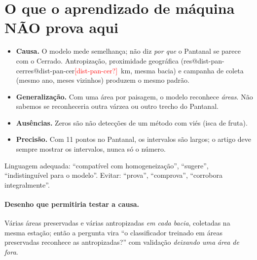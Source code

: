 \documentclass[11pt,a4paper]{article}
\makeatletter
\newcommand{\res}[1]{\ifcsname res@#1\endcsname\csname res@#1\endcsname\else\textcolor{red}{[#1?]}\fi}
\makeatother
\begin{document}
\section{O que o aprendizado de máquina NÃO prova aqui}
\begin{cuidado}
\begin{itemize}[leftmargin=1.2em]
\item \textbf{Causa.} O modelo mede semelhança; não diz \emph{por que} o Pantanal se parece com o
Cerrado. Antropização, proximidade geográfica (\res{dist-pan-cer}~km, mesma bacia) e campanha de
coleta (mesmo ano, meses vizinhos) produzem o mesmo padrão.
\item \textbf{Generalização.} Com uma área por paisagem, o modelo reconhece \emph{áreas}. Não
sabemos se reconheceria outra várzea ou outro trecho do Pantanal.
\item \textbf{Ausências.} Zeros são não detecções de um método com viés (isca de fruta).
\item \textbf{Precisão.} Com 11 pontos no Pantanal, os intervalos são largos; o artigo deve sempre
mostrar os intervalos, nunca só o número.
\end{itemize}
Linguagem adequada: ``compatível com homogeneização'', ``sugere'', ``indistinguível para o
modelo''. Evitar: ``prova'', ``comprova'', ``corrobora integralmente''.
\end{cuidado}

\paragraph{Desenho que permitiria testar a causa.} Várias áreas preservadas e várias antropizadas
\emph{em cada bacia}, coletadas na mesma estação; então a pergunta vira ``o classificador treinado
em áreas preservadas reconhece as antropizadas?'' com validação \emph{deixando uma área de fora}.

\end{document}
